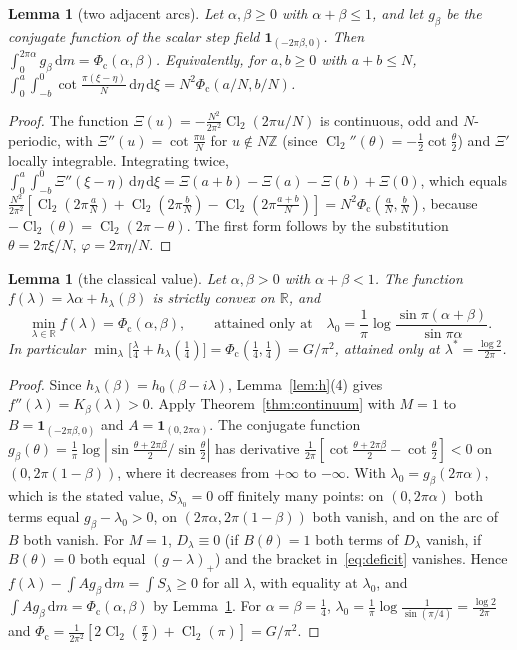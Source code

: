 \documentclass[11pt]{amsart}
\newtheorem{lemma}[theorem]{Lemma}
\theoremstyle{definition}
\theoremstyle{remark}
\numberwithin{equation}{section}
\newcommand{\Z}{\mathbb{Z}}
\newcommand{\R}{\mathbb{R}}
\newcommand{\Cl}{\operatorname{Cl}_2}
\newcommand{\one}{\mathbf{1}}
\newcommand{\Phic}{\Phi_{\mathrm c}}
\newcommand{\dd}{\,\mathrm{d}}
\begin{document}
\begin{lemma}[two adjacent arcs]\label{lem:twoarcs}
Let $\alpha,\beta\ge0$ with $\alpha+\beta\le1$, and let $g_\beta$ be the conjugate function of the scalar step field
$\one_{(-2\pi\beta,0)}$. Then $\int_0^{2\pi\alpha}g_\beta\dd m=\Phic(\alpha,\beta)$. Equivalently, for $a,b\ge0$ with $a+b\le N$,
$\int_0^a\int_{-b}^0\cot\frac{\pi(\xi-\eta)}N\dd\eta\dd\xi=N^2\Phic(a/N,b/N)$.
\end{lemma}

\begin{proof}
The function $\Xi(u)=-\frac{N^2}{2\pi^2}\Cl(2\pi u/N)$ is continuous, odd and $N$-periodic, with $\Xi''(u)=\cot\frac{\pi u}N$
for $u\notin N\Z$ (since $\Cl''(\theta)=-\frac12\cot\frac\theta2$) and $\Xi'$ locally integrable. Integrating twice,
$\int_0^a\int_{-b}^0\Xi''(\xi-\eta)\dd\eta\dd\xi=\Xi(a+b)-\Xi(a)-\Xi(b)+\Xi(0)$, which equals
$\frac{N^2}{2\pi^2}[\Cl(2\pi\frac aN)+\Cl(2\pi\frac bN)-\Cl(2\pi\frac{a+b}N)]=N^2\Phic(\frac aN,\frac bN)$, because
$-\Cl(\theta)=\Cl(2\pi-\theta)$. The first form follows by the substitution $\theta=2\pi\xi/N$, $\varphi=2\pi\eta/N$.
\end{proof}

\begin{lemma}[the classical value]\label{lem:classical}
Let $\alpha,\beta>0$ with $\alpha+\beta<1$. The function $f(\lambda)=\lambda\alpha+h_\lambda(\beta)$ is strictly convex on $\R$, and
\[
\min_{\lambda\in\R}f(\lambda)=\Phic(\alpha,\beta),\qquad\text{attained only at}\quad
\lambda_0=\frac1\pi\log\frac{\sin\pi(\alpha+\beta)}{\sin\pi\alpha}.
\]
In particular $\min_\lambda\bigl[\frac\lambda4+h_\lambda(\frac14)\bigr]=\Phic(\frac14,\frac14)=G/\pi^2$, attained only at $\lambda^*=\frac{\log2}{2\pi}$.
\end{lemma}

\begin{proof}
Since $h_\lambda(\beta)=h_0(\beta-i\lambda)$, Lemma~\ref{lem:h}(4) gives $f''(\lambda)=K_\beta(\lambda)>0$. Apply
Theorem~\ref{thm:continuum} with $M=1$ to $B=\one_{(-2\pi\beta,0)}$ and $A=\one_{(0,2\pi\alpha)}$. The conjugate function
$g_\beta(\theta)=\frac1\pi\log|\sin\frac{\theta+2\pi\beta}2/\sin\frac\theta2|$ has derivative
$\frac1{2\pi}[\cot\frac{\theta+2\pi\beta}2-\cot\frac\theta2]<0$ on $(0,2\pi(1-\beta))$, where it decreases from $+\infty$ to $-\infty$.
With $\lambda_0=g_\beta(2\pi\alpha)$, which is the stated value, $S_{\lambda_0}=0$ off finitely many points: on $(0,2\pi\alpha)$ both
terms equal $g_\beta-\lambda_0>0$, on $(2\pi\alpha,2\pi(1-\beta))$ both vanish, and on the arc of $B$ both vanish. For $M=1$,
$D_\lambda\equiv0$ (if $B(\theta)=1$ both terms of $D_\lambda$ vanish, if $B(\theta)=0$ both equal $(g-\lambda)_+$) and the bracket
in~\eqref{eq:deficit} vanishes. Hence $f(\lambda)-\int Ag_\beta\dd m=\int S_\lambda\ge0$ for all $\lambda$, with equality at $\lambda_0$, and
$\int Ag_\beta\dd m=\Phic(\alpha,\beta)$ by Lemma~\ref{lem:twoarcs}. For $\alpha=\beta=\frac14$,
$\lambda_0=\frac1\pi\log\frac1{\sin(\pi/4)}=\frac{\log2}{2\pi}$ and $\Phic=\frac1{2\pi^2}[2\Cl(\frac\pi2)+\Cl(\pi)]=G/\pi^2$.
\end{proof}
\end{document}
